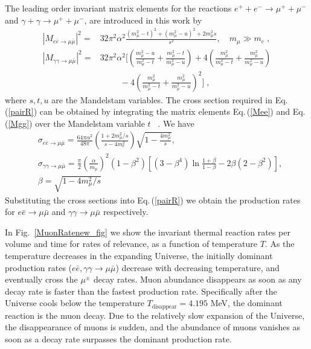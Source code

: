 The leading order invariant matrix elements for the reactions $e^++e^-\to\mu^++\mu^-$ and $\gamma+\gamma\to\mu^++\mu^-$, are introduced in this work by \cite{Kuznetsova:2008jt}
\begin{align}\label{Mee}
|M_{e\bar e\to\mu\bar\mu}|^2=&32\pi^2\alpha^2\frac{(m_\mu^2-t)^2+(m_\mu^2-u)^2+2m_\mu^2s}{s^2},\quad m_\mu\gg m_e\;,\\[0.2cm]
\label{Mgg}
|M_{\gamma\gamma\to\mu\bar\mu}|^2=&32\pi^2\alpha^2\bigg[\left(\frac{m_\mu^2-u}{m_\mu^2-t}+\frac{m_\mu^2-t}{m_\mu^2-u}\right)+4\left(\frac{m_\mu^2}{m_\mu^2-t}+\frac{m_\mu^2}{m^2_\mu-u}\right)\\[0.1cm]  \nonumber
&\hspace{1cm}-4\left(\frac{m_\mu^2}{m^2_\mu-t}+\frac{m^2_\mu}{m^2_\mu-u}\right)^2\bigg]\;,
\end{align}
 where $s, t, u$ are the Mandelstam variables. The cross section required in Eq.\,(\ref{pairR}) can be obtained by integrating the matrix elements Eq.\,(\ref{Mee}) and Eq.\,(\ref{Mgg}) over the Mandelstam variable $t$ ~\cite{PhysRevC.82.035203}. We have
\begin{align}
&\sigma_{e\bar e\to\mu\bar\mu} 
=\frac{64\pi\alpha^2}{48\pi}\left(\frac{1+2m^2_\mu/s}{s-4m_e^2}\right)\sqrt{1-\frac{4m^2_\mu}{s}},\\
&\sigma_{\gamma\gamma\to\mu\bar\mu}=\frac{\pi}{2}\left(\frac{\alpha}{m_\mu}\right)^2(1-\beta^2)\left[(3-\beta^4)\ln\frac{1+\beta}{1-\beta}-2\beta(2-\beta^2)\right],\\
&\beta=\sqrt{1-4m^2_\mu/s}
\end{align}
Substituting the cross sections into Eq.\,(\ref{pairR}) we obtain the production rates for $e\bar e\to\mu\bar\mu$ and $\gamma\gamma\to\mu\bar\mu$ respectively.

 
In Fig.~\ref{MuonRatenew_fig} we show the invariant thermal reaction rates per volume and time for rates of relevance, as a function of temperature $T$.
As the temperature decreases in the expanding Universe, the initially dominant production rates ($e\bar e,\gamma\gamma\to\mu\bar\mu$) decrease with decreasing temperature, and eventually cross the $\mu^\pm$ decay rates. 
Muon abundance disappears as soon as any decay rate is faster than the fastest production rate. Specifically after the Universe cools below the temperature $T_\mathrm{disappear}=4.195$ MeV, the dominant reaction is the muon decay. Due to the relatively slow expansion of the Universe, the disappearance of muons is sudden, and the abundance of muons vanishes as soon as a decay rate surpasses the dominant production rate.
 
